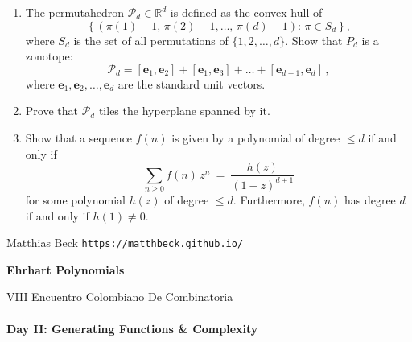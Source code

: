 \documentclass[11pt]{article}
\def\be{\mathbf{e}}
\def\cP{\mathcal{P}}
\def\RR{\mathbb{R}}
\begin{document}
\begin{enumerate}[(1)]
\item The permutahedron $\cP_d \in \RR^d$ is defined as the convex hull of
\[
  \left\{ \left( \pi(1) - 1, \, \pi(2) - 1, \dots, \, \pi(d) - 1 \right) : \, \pi \in S_d \right\} ,
\]
where $S_d$ is the set of all permutations of $\{ 1, 2, \dots, d \}$.
Show that $P_d$ is a zonotope:
\[ \cP_d = [\be_1, \be_2] + [\be_1, \be_3] + \dots + [\be_{ d-1 }, \be_d] \, ,\]
where $\be_1, \be_2, \dots, \be_d$ are the standard unit vectors.

\item Prove that $\cP_d$ tiles the hyperplane spanned by it.

\item Show that a sequence $f(n)$ is given by a polynomial of degree $\le d$ if and only if
    \[
        \sum_{ n \ge 0 } f(n) \, z^n \ = \ \frac{ h(z) }{ (1-z)^{ d+1 } }
    \]
    for some polynomial $h(z)$ of degree $\le d$.  Furthermore, $f(n)$ has
    degree $d$ if and only if $h(1) \ne 0$.

\end{enumerate}


{\sc Matthias Beck} \hfill {\tt https://matthbeck.github.io/}


\newpage
\begin{center}
\Large{\bf Ehrhart Polynomials} 

\normalsize
VIII Encuentro Colombiano De Combinatoria
\end{center}

\paragraph{Day II: Generating Functions \& Complexity}
\end{document}
